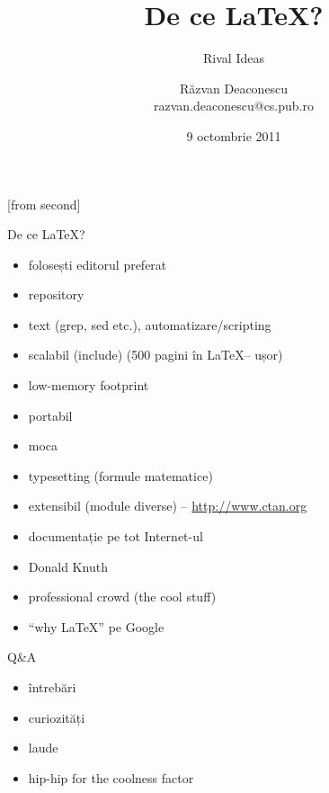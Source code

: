 \documentclass{beamer}
\title[\LaTeX]{De ce \LaTeX?}
\subtitle{Rival Ideas}
\institute{ROSEdu/ACS}
\author[Răzvan Deaconescu]{Răzvan Deaconescu\\
      razvan.deaconescu@cs.pub.ro}
\date{9 octombrie 2011}
\begin{document}
[from second]

\frame{\titlepage}

\begin{frame}{De ce \LaTeX?}
  \begin{itemize}
    \pause \item folosești editorul preferat
    \pause \item repository
    \pause \item text (grep, sed etc.), automatizare/scripting
    \pause \item scalabil (include) (500 pagini în \LaTeX -- ușor)
    \pause \item low-memory footprint
    \pause \item portabil
    \pause \item moca
    \pause \item typesetting (formule matematice)
    \pause \item extensibil (module diverse) -- \url{http://www.ctan.org}
    \pause \item documentație pe tot Internet-ul
    \pause \item Donald Knuth
    \pause \item professional crowd (the cool stuff)
    \pause \item ``why \LaTeX'' pe Google
  \end{itemize}
\end{frame}

\begin{frame}{Q\&A}
  \begin{itemize}
    \item întrebări
    \item curiozități
    \item laude
    \item hip-hip for the coolness factor
  \end{itemize}
\end{frame}
\end{document}

